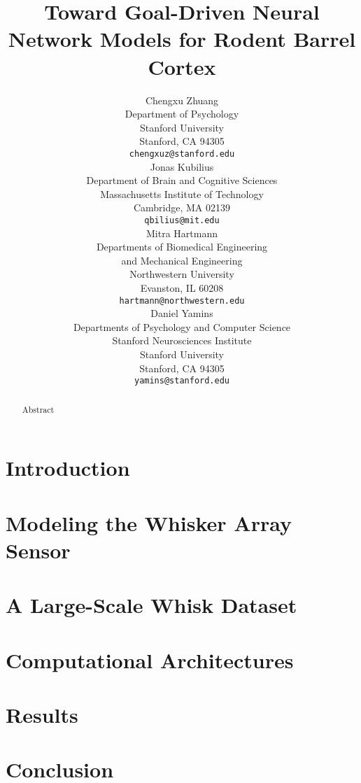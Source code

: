 \documentclass{article}
\title{Toward Goal-Driven Neural Network Models for Rodent Barrel Cortex}
\author{
Chengxu Zhuang\\
Department of Psychology\\
Stanford University\\
Stanford, CA 94305 \\
\texttt{chengxuz@stanford.edu} \\
\And
Jonas Kubilius \\
Department of Brain and Cognitive Sciences \\
Massachusetts Institute of Technology \\
Cambridge, MA  02139\\
\texttt{qbilius@mit.edu} \\
\And
Mitra Hartmann \\
Departments of Biomedical Engineering \\
and Mechanical Engineering \\
Northwestern University \\
Evanston, IL  60208\\
\texttt{hartmann@northwestern.edu} \\
\And
Daniel Yamins \\
Departments of Psychology and Computer Science \\
Stanford Neurosciences Institute \\
Stanford University \\
Stanford, CA 94305 \\
\texttt{yamins@stanford.edu} \\
}
\begin{document}

\maketitle

\begin{abstract}
Abstract
\end{abstract}


\section{Introduction} %


\section{Modeling the Whisker Array Sensor} %


\section{A Large-Scale Whisk Dataset} %


\section{Computational Architectures} %


\section{Results} %


\section{Conclusion}  %




{\small
}

\end{document}
